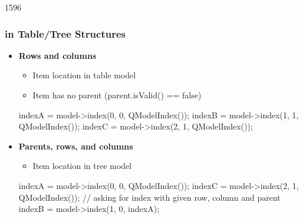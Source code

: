 \begin{slide}[fragile]{1596}\frametitle{ in Table/Tree
  Structures}
  \begin{itemize}
  \item \textbf{Rows and columns}
    \begin{itemize}
    \item Item location in table model
    \item Item has no parent (parent.isValid() == false)
   \end{itemize}
   \begin{cpp}
indexA = model->index(0, 0, QModelIndex());
indexB = model->index(1, 1, QModelIndex());
indexC = model->index(2, 1, QModelIndex());      
    \end{cpp}
\medskip
\item \textbf{Parents, rows, and columns}
  \begin{itemize}
  \item Item location in tree model
  \end{itemize}

    \begin{cpp}
indexA = model->index(0, 0, QModelIndex());
indexC = model->index(2, 1, QModelIndex());
// asking for index with given row, column and parent
indexB = model->index(1, 0, indexA);      
    \end{cpp}
  \end{itemize}
  
\end{slide}


